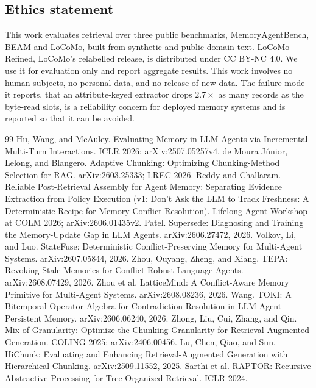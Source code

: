 \documentclass{article}
\begin{document}
\subsection*{Ethics statement}

This work evaluates retrieval over three public benchmarks, MemoryAgentBench, BEAM and LoCoMo, built from synthetic and public-domain text. LoCoMo-Refined, LoCoMo's relabelled release, is distributed under CC BY-NC 4.0. We use it for evaluation only and report aggregate results. This work
involves no human subjects, no personal data, and no release of new data. The failure mode it reports,
that an attribute-keyed extractor drops $2.7\times$ as many records as the byte-read slots, is a reliability concern for
deployed memory systems and is reported so that it can be avoided.

\begin{thebibliography}{99}\small
{} Hu, Wang, and McAuley. Evaluating Memory in LLM Agents via Incremental Multi-Turn Interactions. ICLR 2026; arXiv:2507.05257v4.
 de Moura J\'unior, Lelong, and Blangero. Adaptive Chunking: Optimizing Chunking-Method Selection for RAG. arXiv:2603.25333; LREC 2026.
 Reddy and Challaram. Reliable Post-Retrieval Assembly for Agent Memory: Separating Evidence Extraction from Policy Execution (v1: Don't Ask the LLM to Track Freshness: A Deterministic Recipe for Memory Conflict Resolution). Lifelong Agent Workshop at COLM 2026; arXiv:2606.01435v2.
 Patel. Supersede: Diagnosing and Training the Memory-Update Gap in LLM Agents. arXiv:2606.27472, 2026.
 Volkov, Li, and Luo. StateFuse: Deterministic Conflict-Preserving Memory for Multi-Agent Systems. arXiv:2607.05844, 2026.
 Zhou, Ouyang, Zheng, and Xiang. TEPA: Revoking Stale Memories for Conflict-Robust Language Agents. arXiv:2608.07429, 2026.
 Zhou et al. LatticeMind: A Conflict-Aware Memory Primitive for Multi-Agent Systems. arXiv:2608.08236, 2026.
 Wang. TOKI: A Bitemporal Operator Algebra for Contradiction Resolution in LLM-Agent Persistent Memory. arXiv:2606.06240, 2026.
 Zhong, Liu, Cui, Zhang, and Qin. Mix-of-Granularity: Optimize the Chunking Granularity for Retrieval-Augmented Generation. COLING 2025; arXiv:2406.00456.
 Lu, Chen, Qiao, and Sun. HiChunk: Evaluating and Enhancing Retrieval-Augmented Generation with Hierarchical Chunking. arXiv:2509.11552, 2025.
 Sarthi et al. RAPTOR: Recursive Abstractive Processing for Tree-Organized Retrieval. ICLR 2024.

\end{thebibliography}
\end{document}
